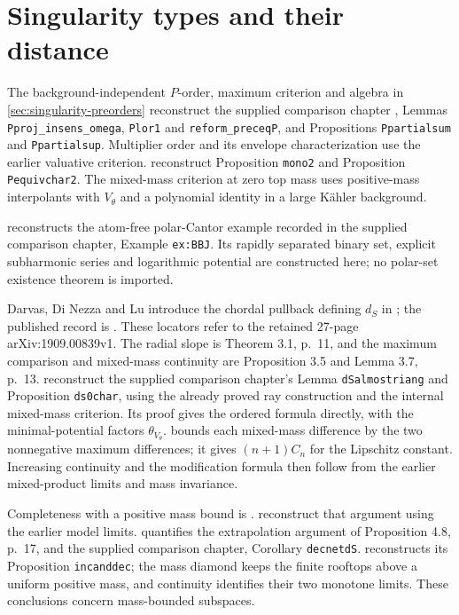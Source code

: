 \section{Singularity types and their distance}\label{sec:history-singularity-types}
The background-independent $P$-order, maximum criterion and algebra in \cref{sec:singularity-preorders} reconstruct the supplied comparison chapter \cite{XiaSampleBook}, Lemmas \texttt{Pproj\_insens\_omega}, \texttt{Plor1} and \texttt{reform\_preceqP}, and Propositions \texttt{Ppartialsum} and \texttt{Ppartialsup}. Multiplier order and its envelope characterization use the earlier valuative criterion.  reconstruct Proposition \texttt{mono2} and Proposition \texttt{Pequivchar2}. The mixed-mass criterion at zero top mass uses positive-mass interpolants with $V_\theta$ and a polynomial identity in a large K\"ahler background.

 reconstructs the atom-free polar-Cantor example recorded in the supplied comparison chapter, Example \texttt{ex:BBJ}. Its rapidly separated binary set, explicit subharmonic series and logarithmic potential are constructed here; no polar-set existence theorem is imported.

Darvas, Di Nezza and Lu introduce the chordal pullback defining $d_S$ in \cite[Section 3, pp.~11--13]{DDNL2019metricv1}; the published record is \cite{DDNLmetric}. These locators refer to the retained 27-page arXiv:1909.00839v1. The radial slope is Theorem 3.1, p.~11, and the maximum comparison and mixed-mass continuity are Proposition 3.5 and Lemma 3.7, p.~13.  reconstruct the supplied comparison chapter's Lemma \texttt{dSalmostriang} and Proposition \texttt{ds0char}, using the already proved ray construction and the internal mixed-mass criterion. Its proof gives the ordered formula directly, with the minimal-potential factors $\theta_{V_\theta}$.  bounds each mixed-mass difference by the two nonnegative maximum differences; it gives $(n+1)C_n$ for the Lipschitz constant. Increasing continuity and the modification formula then follow from the earlier mixed-product limits and mass invariance.

Completeness with a positive mass bound is \cite[Proposition 4.2 and Theorem 4.9, pp.~14 and 17]{DDNL2019metricv1}.  reconstruct that argument using the earlier model limits.  quantifies the extrapolation argument of Proposition 4.8, p.~17, and the supplied comparison chapter, Corollary \texttt{decnetdS}.  reconstructs its Proposition \texttt{incanddec}; the mass diamond keeps the finite rooftops above a uniform positive mass, and continuity identifies their two monotone limits. These conclusions concern mass-bounded subspaces.

